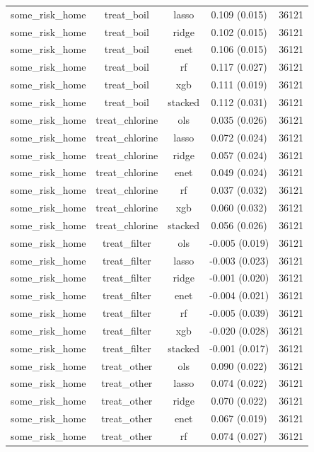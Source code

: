 \begin{table}[htbp]
\begin{tabular}{lcccc}
some_risk_home & treat_boil & lasso & 0.109 (0.015) & 36121 \\
some_risk_home & treat_boil & ridge & 0.102 (0.015) & 36121 \\
some_risk_home & treat_boil & enet & 0.106 (0.015) & 36121 \\
some_risk_home & treat_boil & rf & 0.117 (0.027) & 36121 \\
some_risk_home & treat_boil & xgb & 0.111 (0.019) & 36121 \\
some_risk_home & treat_boil & stacked & 0.112 (0.031) & 36121 \\
some_risk_home & treat_chlorine & ols & 0.035 (0.026) & 36121 \\
some_risk_home & treat_chlorine & lasso & 0.072 (0.024) & 36121 \\
some_risk_home & treat_chlorine & ridge & 0.057 (0.024) & 36121 \\
some_risk_home & treat_chlorine & enet & 0.049 (0.024) & 36121 \\
some_risk_home & treat_chlorine & rf & 0.037 (0.032) & 36121 \\
some_risk_home & treat_chlorine & xgb & 0.060 (0.032) & 36121 \\
some_risk_home & treat_chlorine & stacked & 0.056 (0.026) & 36121 \\
some_risk_home & treat_filter & ols & -0.005 (0.019) & 36121 \\
some_risk_home & treat_filter & lasso & -0.003 (0.023) & 36121 \\
some_risk_home & treat_filter & ridge & -0.001 (0.020) & 36121 \\
some_risk_home & treat_filter & enet & -0.004 (0.021) & 36121 \\
some_risk_home & treat_filter & rf & -0.005 (0.039) & 36121 \\
some_risk_home & treat_filter & xgb & -0.020 (0.028) & 36121 \\
some_risk_home & treat_filter & stacked & -0.001 (0.017) & 36121 \\
some_risk_home & treat_other & ols & 0.090 (0.022) & 36121 \\
some_risk_home & treat_other & lasso & 0.074 (0.022) & 36121 \\
some_risk_home & treat_other & ridge & 0.070 (0.022) & 36121 \\
some_risk_home & treat_other & enet & 0.067 (0.019) & 36121 \\
some_risk_home & treat_other & rf & 0.074 (0.027) & 36121 \\

\end{tabular}
\end{table}
